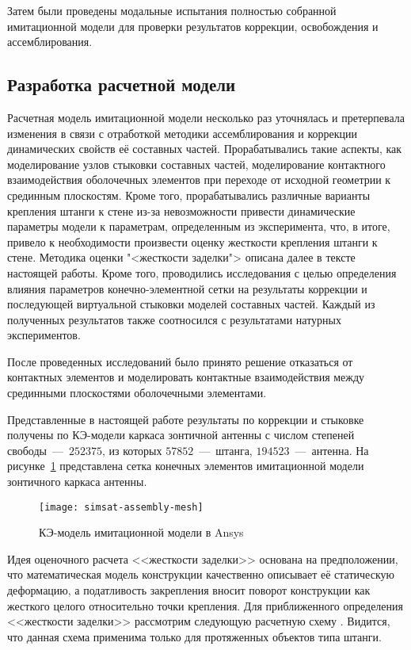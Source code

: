 Затем были проведены модальные испытания полностью собранной имитационной модели для проверки результатов коррекции, освобождения и ассемблирования. 

\subsection{Разработка расчетной модели} \label{struct:simsat-model}

Расчетная модель имитационной модели несколько раз уточнялась и претерпевала изменения в связи с отработкой методики ассемблирования и коррекции динамических свойств её составных частей. Прорабатывались такие аспекты, как моделирование узлов стыковки составных частей, моделирование контактного взаимодействия оболочечных элементов при переходе от исходной геометрии к срединным плоскостям. Кроме того, прорабатывались различные варианты крепления штанги к стене из-за невозможности привести динамические параметры модели к параметрам, определенным из эксперимента, что, в итоге, привело к необходимости произвести оценку жесткости крепления штанги к стене. Методика оценки "<жесткости заделки"> описана далее в тексте настоящей работы. Кроме того, проводились исследования с целью определения влияния параметров конечно-элементной сетки на результаты коррекции и последующей виртуальной стыковки моделей составных частей. Каждый из полученных результатов также соотносился с результатами натурных экспериментов. 

После проведенных исследований было принято решение отказаться от контактных элементов и моделировать контактные взаимодействия между срединными плоскостями оболочечными элементами. 

Представленные в настоящей работе результаты по коррекции и стыковке получены по КЭ-модели каркаса зонтичной  антенны с числом степеней свободы~---~$ 252375 $, из которых $ 57852 $~---~штанга, $ 194523 $~---~антенна. На рисунке~\ref{fig:simsat-assembly-mesh} представлена сетка конечных элементов имитационной модели зонтичного каркаса антенны.

\begin{figure}[!htb]
	\centerfloat
	\texttt{[image: simsat-assembly-mesh]}
	\caption{КЭ-модель имитационной модели в Ansys} \label{fig:simsat-assembly-mesh}
\end{figure}

Идея оценочного расчета <<жесткости заделки>> основана на предположении, что математическая модель конструкции качественно описывает её статическую деформацию, а податливость закрепления вносит поворот конструкции как жесткого целого относительно точки крепления. Для приближенного определения <<жесткости заделки>> рассмотрим следующую расчетную схему . Видится, что данная схема применима только для протяженных объектов типа штанги.

